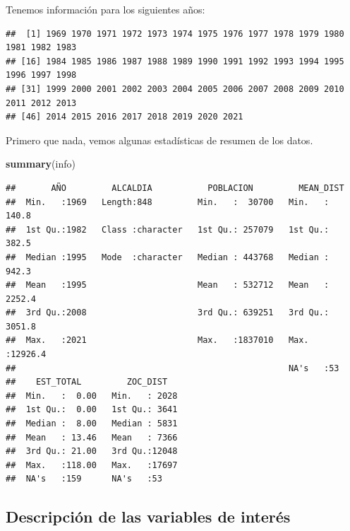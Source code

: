 \documentclass[
]{article}
\newenvironment{Shaded}{\begin{snugshade}}{\end{snugshade}}
\newcommand{\KeywordTok}[1]{\textcolor[rgb]{0.13,0.29,0.53}{\textbf{#1}}}
\newcommand{\NormalTok}[1]{#1}
\newcommand{\OperatorTok}[1]{\textcolor[rgb]{0.81,0.36,0.00}{\textbf{#1}}}
\begin{document}
Tenemos información para los siguientes años:

\begin{Shaded}
\end{Shaded}

\begin{verbatim}
##  [1] 1969 1970 1971 1972 1973 1974 1975 1976 1977 1978 1979 1980 1981 1982 1983
## [16] 1984 1985 1986 1987 1988 1989 1990 1991 1992 1993 1994 1995 1996 1997 1998
## [31] 1999 2000 2001 2002 2003 2004 2005 2006 2007 2008 2009 2010 2011 2012 2013
## [46] 2014 2015 2016 2017 2018 2019 2020 2021
\end{verbatim}

Primero que nada, vemos algunas estadísticas de resumen de los datos.

\begin{Shaded}
\begin{Highlighting}[]
\KeywordTok{summary}\NormalTok{(info)}
\end{Highlighting}
\end{Shaded}

\begin{verbatim}
##       AÑO         ALCALDIA           POBLACION         MEAN_DIST      
##  Min.   :1969   Length:848         Min.   :  30700   Min.   :  140.8  
##  1st Qu.:1982   Class :character   1st Qu.: 257079   1st Qu.:  382.5  
##  Median :1995   Mode  :character   Median : 443768   Median :  942.3  
##  Mean   :1995                      Mean   : 532712   Mean   : 2252.4  
##  3rd Qu.:2008                      3rd Qu.: 639251   3rd Qu.: 3051.8  
##  Max.   :2021                      Max.   :1837010   Max.   :12926.4  
##                                                      NA's   :53       
##    EST_TOTAL         ZOC_DIST    
##  Min.   :  0.00   Min.   : 2028  
##  1st Qu.:  0.00   1st Qu.: 3641  
##  Median :  8.00   Median : 5831  
##  Mean   : 13.46   Mean   : 7366  
##  3rd Qu.: 21.00   3rd Qu.:12048  
##  Max.   :118.00   Max.   :17697  
##  NA's   :159      NA's   :53
\end{verbatim}

\hypertarget{descripciuxf3n-de-las-variables-de-interuxe9s}{%
\subsection{Descripción de las variables de
interés}\label{descripciuxf3n-de-las-variables-de-interuxe9s}}
\end{document}
